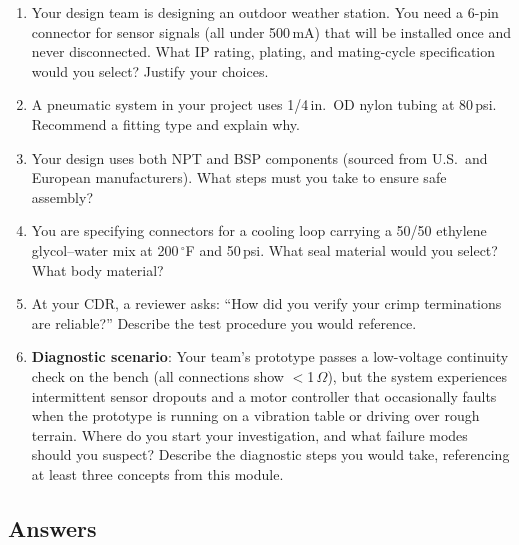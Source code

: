 \documentclass[11pt,letterpaper,twoside,openany]{book}
\begin{document}
\begin{enumerate}[resume,leftmargin=1.5em]
  \item Your design team is designing an outdoor weather station. You need a 6-pin connector for sensor signals (all under 500\,mA) that will be installed once and never disconnected. What IP rating, plating, and mating-cycle specification would you select? Justify your choices.

  \item A pneumatic system in your project uses 1/4\,in.\ OD nylon tubing at 80\,psi. Recommend a fitting type and explain why.

  \item Your design uses both NPT and BSP components (sourced from U.S.\ and European manufacturers). What steps must you take to ensure safe assembly?

  \item You are specifying connectors for a cooling loop carrying a 50/50 ethylene glycol--water mix at 200\,$^{\circ}$F and 50\,psi. What seal material would you select? What body material?

  \item At your CDR, a reviewer asks: ``How did you verify your crimp terminations are reliable?'' Describe the test procedure you would reference.

  \item \textbf{Diagnostic scenario}: Your team's prototype passes a low-voltage continuity check on the bench (all connections show $<$1\,$\Omega$), but the system experiences intermittent sensor dropouts and a motor controller that occasionally faults when the prototype is running on a vibration table or driving over rough terrain. Where do you start your investigation, and what failure modes should you suspect? Describe the diagnostic steps you would take, referencing at least three concepts from this module.
\end{enumerate}


\newpage
\subsection{Answers}
\end{document}

